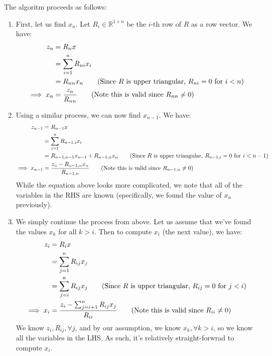 \documentclass[12pt]{exam}
\begin{document}
\begin{questions}
\begin{solution}
    The algoritm proceeds as follows:
    \begin{enumerate}
      \item First, let us find $x_n$. Let $R_i \in \mathbb{R}^{1 \times n}$ be the $i$-th row of $R$ as a row vector. We have:
        \begin{align*}
          z_n &= R_n x \\
          &= \sum_{i=1}^n R_{ni} x_i \\
          &= R_{nn} x_n \tag{Since $R$ is upper triangular, $R_{ni} = 0$ for $i < n$} \\
          \implies x_n &= \frac{z_n}{R_{nn}} \tag{Note this is valid since $R_{nn} \neq 0$}
        \end{align*}
      \item Using a similar process, we can now find $x_{n-1}$. We have:
        \begin{align*}
          z_{n-1} &= R_{n-1} x \\
          &= \sum_{i=1}^n R_{n-1,i} x_i \\
          &= R_{n-1, n-1}x_{n-1} + R_{n-1,n} x_n \tag{Since $R$ is upper triangular, $R_{n-1,i} = 0$ for $i < n-1$} \\
          \implies x_{n-1} &= \frac{z_n - R_{n-1,n}x_n}{R_{n-1,n}} \tag{Note this is valid since $R_{n-1,n} \neq 0$}
        \end{align*}
        While the equation above looks more complicated, we note that all of the variables in the RHS are known (specifically, we found the value of $x_n$ previously).
      \item We simply continue the process from above. Let us assume that we've found the values $x_k$ for all $k > i$. Then to compute $x_i$ (the next value), we have:
        \begin{align*}
          z_i &= R_i x \\
          &= \sum_{j=1}^n R_{ij} x_j \\
          &= \sum_{j=i}^n R_{ij} x_j\tag{Since $R$ is upper triangular, $R_{ij} = 0$ for $j < i$} \\
          \implies x_i &= \frac{z_i - \sum_{j=i+1}^n R_{ij} x_j}{R_{ii}} \tag{Note this is valid since $R_{ii} \neq 0$}
        \end{align*}
        We know $z_i, R_{ij}, \forall j$, and by our assumption, we know $x_k, \forall k > i$, so we know all the variables in the LHS. As such, it's relatively straight-forwrad to compute $x_i$.
    \end{enumerate}


\end{solution}
\end{questions}
\end{document}
